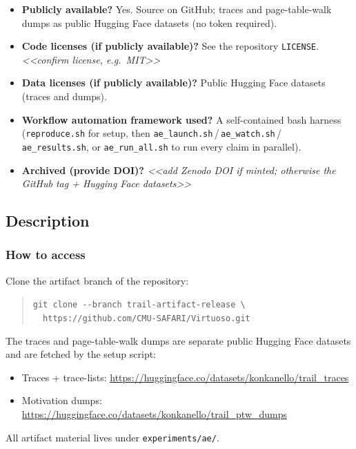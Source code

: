 \begin{itemize}
        $\sim$1\,day; the longest single claim (\texttt{table6}) takes
        $\sim$10\,h. A single claim, e.g.\ the headline \texttt{head8mb}, is
        far cheaper; an \texttt{--icount} flag shrinks every job to a
        minutes-long smoke test.
  \item \textbf{Publicly available?} Yes. Source on GitHub; traces and
        page-table-walk dumps as public Hugging Face datasets (no token
        required).
  \item \textbf{Code licenses (if publicly available)?} See the repository
        \texttt{LICENSE}. \emph{<<confirm license, e.g.\ MIT>>}
  \item \textbf{Data licenses (if publicly available)?} Public Hugging Face
        datasets (traces and dumps).
  \item \textbf{Workflow automation framework used?} A self-contained bash
        harness (\texttt{reproduce.sh} for setup, then
        \texttt{ae\_launch.sh}\,/\,\texttt{ae\_watch.sh}\,/\,%
        \texttt{ae\_results.sh}, or \texttt{ae\_run\_all.sh} to run every claim
        in parallel).
  \item \textbf{Archived (provide DOI)?} \emph{<<add Zenodo DOI if minted;
        otherwise the GitHub tag + Hugging Face datasets>>}
\end{itemize}

\subsection{Description}

\subsubsection{How to access}
Clone the artifact branch of the repository:
\begin{quote}\small
\texttt{git clone -{}-branch trail-artifact-release \textbackslash}\\
\texttt{\ \ https://github.com/CMU-SAFARI/Virtuoso.git}
\end{quote}
The traces and page-table-walk dumps are separate public Hugging Face
datasets and are fetched by the setup script:
\begin{itemize}
  \item Traces + trace-lists: \url{https://huggingface.co/datasets/konkanello/trail_traces}
  \item Motivation dumps: \url{https://huggingface.co/datasets/konkanello/trail_ptw_dumps}
\end{itemize}
All artifact material lives under \texttt{experiments/ae/}.

